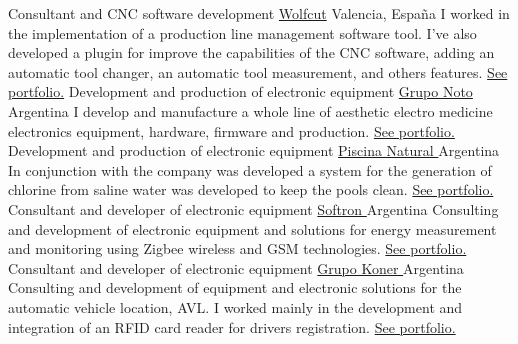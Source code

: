       {Consultant and CNC software development            }{\href{www.wolfcut.es}{Wolfcut}                              }{Valencia, España            }{}{ I worked in the implementation of a production line management software tool. I've also developed a plugin for improve the capabilities of the CNC software, adding an automatic tool changer, an automatic tool measurement, and others features. \hyperlink{subsec:wolfcut}{See portfolio.} }
      {Development and production of electronic equipment }{\href{ www.gruponoto.com            }{ Grupo Noto        }  }{Argentina                   }{}{ I develop and manufacture a whole line of aesthetic electro medicine electronics equipment, hardware, firmware and production. \hyperlink                                                                                                                                                                                                                                                                                                                                   {subsec:noto}{ See portfolio. } }
      {Development and production of electronic equipment }{\href{ www.piscinanatural.com       }{ Piscina Natural   }  }{Argentina                   }{}{ In conjunction with the company was developed a system for the generation of chlorine from saline water was developed to keep the pools clean. \hyperlink                                                                                                                                                                                                                                                                                                                   {subsec:piscina}{ See portfolio. } }
      {Consultant and developer of electronic equipment   }{\href{ www.softron.biz              }{ Softron           }  }{Argentina                   }{}{ Consulting and development of electronic equipment and solutions for energy measurement and monitoring using Zigbee wireless and GSM technologies. \hyperlink                                                                                                                                                                                                                                                                                                               {subsec:softron}{ See portfolio. } }
      {Consultant and developer of electronic equipment   }{\href{ www.grupokoner.com           }{ Grupo Koner       }  }{Argentina                   }{}{ Consulting and development of equipment and electronic solutions for the automatic vehicle location, AVL. I worked mainly in the development and integration of an RFID card reader for drivers registration. \hyperlink                                                                                                                                                                                                                                                    {subsec:koner}{ See portfolio. } }
